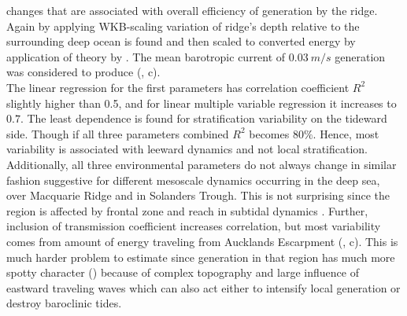 \documentclass[12pt]{article}
\begin{document}
changes that are associated with overall efficiency of generation by the ridge. Again by applying 
WKB-scaling variation of ridge's depth relative to the surrounding deep ocean is found and then 
scaled to converted energy by application of theory by \citep{st2003generation}. The 
mean barotropic current of $0.03~m/s$ generation was considered to produce 
(, 
c).\\
The linear regression for the first parameters has correlation coefficient $R^2$ slightly higher 
than 0.5, and for linear multiple variable regression it increases to $0.7$. The least dependence 
is found for stratification variability on the tideward side. Though if all three parameters 
combined $R^2$ becomes $80\%$. Hence, most variability is associated with leeward dynamics and not 
local stratification. Additionally, all three environmental parameters do not always change in 
similar fashion suggestive for different mesoscale dynamics occurring in the deep sea, over 
Macquarie Ridge and in Solanders Trough. This is not surprising since the region is affected by 
frontal zone and reach in subtidal dynamics \citep{smith2013interaction}. Further, inclusion of 
transmission coefficient increases correlation, but most variability comes from amount of energy 
traveling from Aucklands Escarpment 
(, c). This is much harder problem to estimate since generation in that 
region has much more spotty character () because of complex topography and large 
influence of eastward traveling waves which can also act either to intensify local generation or 
destroy baroclinic tides.
\end{document}

